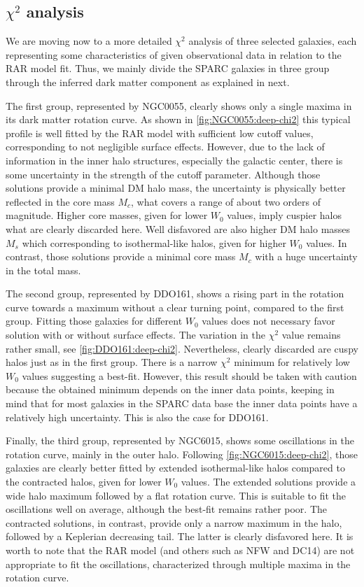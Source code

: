 \subsection[Best-fit analysis]{$\chi^2$ analysis}
We are moving now to a more detailed $\chi^2$ analysis of three selected galaxies, each representing some characteristics of given observational data in relation to the RAR model fit. Thus, we mainly divide the SPARC galaxies in three group through the inferred dark matter component as explained in next.

The first group, represented by NGC0055, clearly shows only a single maxima in its dark matter rotation curve. As shown in \cref{fig:NGC0055:deep-chi2} this typical profile is well fitted by the RAR model with sufficient low cutoff values, corresponding to not negligible surface effects. However, due to the lack of information in the inner halo structures, especially the galactic center, there is some uncertainty in the strength of the cutoff parameter. Although those solutions provide a minimal DM halo mass, the uncertainty is physically better reflected in the core mass $M_c$, what covers a range of about two orders of magnitude. Higher core masses, given for lower $W_0$ values, imply cuspier halos what are clearly discarded here. Well disfavored are also higher DM halo masses $M_s$ which corresponding to isothermal-like halos, given for higher $W_0$ values. In contrast, those solutions provide a minimal core mass $M_c$ with a huge uncertainty in the total mass.

The second group, represented by DDO161, shows a rising part in the rotation curve towards a maximum without a clear turning point, compared to the first group. Fitting those galaxies for different $W_0$ values does not necessary favor solution with or without surface effects. The variation in the $\chi^2$ value remains rather small, see \cref{fig:DDO161:deep-chi2}. Nevertheless, clearly discarded are cuspy halos just as in the first group. There is a narrow $\chi^2$ minimum for relatively low $W_0$ values suggesting a best-fit. However, this result should be taken with caution because the obtained minimum depends on the inner data points, keeping in mind that for most galaxies in the SPARC data base the inner data points have a relatively high uncertainty. This is also the case for DDO161.

Finally, the third group, represented by NGC6015, shows some oscillations in the rotation curve, mainly in the outer halo. Following \cref{fig:NGC6015:deep-chi2}, those galaxies are clearly better fitted by extended isothermal-like halos compared to the contracted halos, given for lower $W_0$ values. The extended solutions provide a wide halo maximum followed by a flat rotation curve. This is suitable to fit the oscillations well on average, although the best-fit remains rather poor. The contracted solutions, in contrast, provide only a narrow maximum in the halo, followed by a Keplerian decreasing tail. The latter is clearly disfavored here. It is worth to note that the RAR model (and others such as NFW and DC14) are not appropriate to fit the oscillations, characterized through multiple maxima in the rotation curve.

